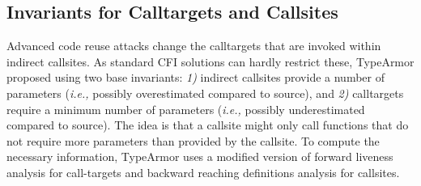 \subsection{Invariants for Calltargets and Callsites}
\label{Invariants for Targets and Callsites}
Advanced code reuse attacks change the calltargets that are invoked within indirect 
callsites. As standard CFI solutions can hardly restrict these, TypeArmor proposed using two base invariants:
\textit{1)} indirect callsites provide a number of parameters (\textit{i.e.,} possibly overestimated compared to source), and 
\textit{2)} calltargets require a minimum number of parameters (\textit{i.e.,} possibly underestimated compared to source).
The idea is that a callsite might only call functions that do not require more parameters than provided by the callsite. 
To compute the necessary information, TypeArmor uses a modified version of forward liveness analysis for call-targets and 
backward reaching definitions analysis for callsites.

